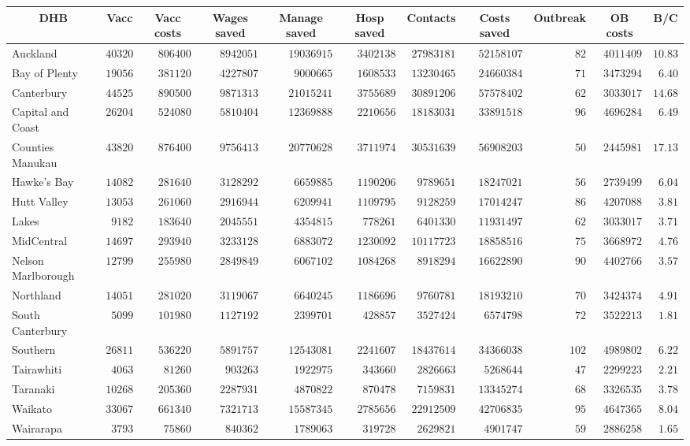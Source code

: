 \documentclass{article}
\begin{document}
\begin{table}\small
\begin{center}
\begin{tabular}{lrrrrrrrrrr}
\hline\hline
\multicolumn{1}{c}{DHB}&\multicolumn{1}{c}{Vacc}&\multicolumn{1}{c}{Vacc costs}&\multicolumn{1}{c}{Wages saved}&\multicolumn{1}{c}{Manage saved}&\multicolumn{1}{c}{Hosp saved}&\multicolumn{1}{c}{Contacts}&\multicolumn{1}{c}{Costs saved}&\multicolumn{1}{c}{Outbreak}&\multicolumn{1}{c}{OB costs}&\multicolumn{1}{c}{B/C}\tabularnewline
\hline
Auckland&$40320$&$806400$&$ 8942051$&$19036915$&$3402138$&$27983181$&$52158107$&$ 82$&$4011409$&$10.83$\tabularnewline
Bay of Plenty&$19056$&$381120$&$ 4227807$&$ 9000665$&$1608533$&$13230465$&$24660384$&$ 71$&$3473294$&$ 6.40$\tabularnewline
Canterbury&$44525$&$890500$&$ 9871313$&$21015241$&$3755689$&$30891206$&$57578402$&$ 62$&$3033017$&$14.68$\tabularnewline
Capital and Coast&$26204$&$524080$&$ 5810404$&$12369888$&$2210656$&$18183031$&$33891518$&$ 96$&$4696284$&$ 6.49$\tabularnewline
Counties Manukau&$43820$&$876400$&$ 9756413$&$20770628$&$3711974$&$30531639$&$56908203$&$ 50$&$2445981$&$17.13$\tabularnewline
Hawke's Bay&$14082$&$281640$&$ 3128292$&$ 6659885$&$1190206$&$ 9789651$&$18247021$&$ 56$&$2739499$&$ 6.04$\tabularnewline
Hutt Valley&$13053$&$261060$&$ 2916944$&$ 6209941$&$1109795$&$ 9128259$&$17014247$&$ 86$&$4207088$&$ 3.81$\tabularnewline
Lakes&$ 9182$&$183640$&$ 2045551$&$ 4354815$&$ 778261$&$ 6401330$&$11931497$&$ 62$&$3033017$&$ 3.71$\tabularnewline
MidCentral&$14697$&$293940$&$ 3233128$&$ 6883072$&$1230092$&$10117723$&$18858516$&$ 75$&$3668972$&$ 4.76$\tabularnewline
Nelson Marlborough&$12799$&$255980$&$ 2849849$&$ 6067102$&$1084268$&$ 8918294$&$16622890$&$ 90$&$4402766$&$ 3.57$\tabularnewline
Northland&$14051$&$281020$&$ 3119067$&$ 6640245$&$1186696$&$ 9760781$&$18193210$&$ 70$&$3424374$&$ 4.91$\tabularnewline
South Canterbury&$ 5099$&$101980$&$ 1127192$&$ 2399701$&$ 428857$&$ 3527424$&$ 6574798$&$ 72$&$3522213$&$ 1.81$\tabularnewline
Southern&$26811$&$536220$&$ 5891757$&$12543081$&$2241607$&$18437614$&$34366038$&$102$&$4989802$&$ 6.22$\tabularnewline
Tairawhiti&$ 4063$&$ 81260$&$  903263$&$ 1922975$&$ 343660$&$ 2826663$&$ 5268644$&$ 47$&$2299223$&$ 2.21$\tabularnewline
Taranaki&$10268$&$205360$&$ 2287931$&$ 4870822$&$ 870478$&$ 7159831$&$13345274$&$ 68$&$3326535$&$ 3.78$\tabularnewline
Waikato&$33067$&$661340$&$ 7321713$&$15587345$&$2785656$&$22912509$&$42706835$&$ 95$&$4647365$&$ 8.04$\tabularnewline
Wairarapa&$ 3793$&$ 75860$&$  840362$&$ 1789063$&$ 319728$&$ 2629821$&$ 4901747$&$ 59$&$2886258$&$ 1.65$\tabularnewline

\end{tabular}
\end{center}
\end{table}
\end{document}

